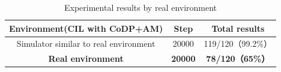 

\begin{table}[hbtp]
  \caption{Experimental results by real environment}
  \label{table:real}
  \centering
  \begin{tabular}{|c|c|c|}
    \hline
      Environment(CIL with CoDP+AM)
     & Step & Total results\\
    \hline
    Simulator similar to real environment & 20000 & 119/120（99.2\%）\\
    \hline
    \textbf{Real environment}
    & \textbf{20000} & \textbf{78/120（65\%）}\\
    \hline
  \end{tabular}
\end{table}

\newpage

